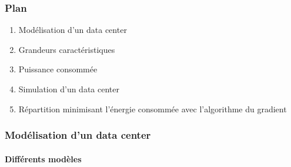 \documentclass[a4paper,11pt]{beamer}
\begin{document}
\begin{frame}
    \frametitle{Plan}
    \begin{enumerate}
        \item Modélisation d'un data center
        \item Grandeurs caractéristiques
        \item Puissance consommée
        \item Simulation d'un data center
        \item Répartition minimisant l'énergie consommée avec l'algorithme du gradient
    \end{enumerate}
\end{frame}

\begin{frame}
    \frametitle{Modélisation d'un data center}
    \framesubtitle{Différents modèles}


\end{frame}
\end{document}
